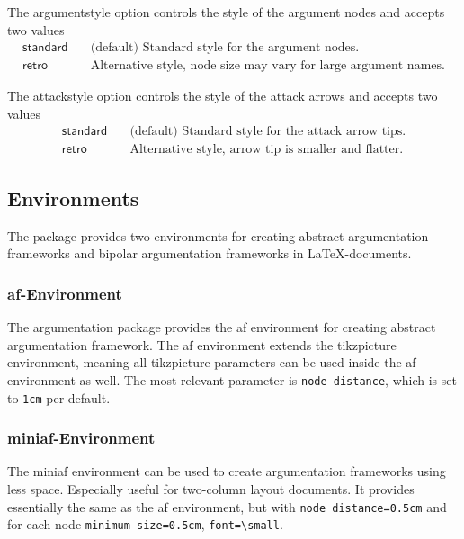 \documentclass{article}
\begin{document}
    The \textsf{argumentstyle} option controls the style of the argument nodes and accepts two values
        \begin{align*}
            \mathsf{standard} &\quad \text{(default) Standard style for the argument nodes.}\\
            \mathsf{retro} &\quad \text{Alternative style, node size may vary for large argument names.}
        \end{align*}

    The \textsf{attackstyle} option controls the style of the attack arrows and accepts two values
    \begin{align*}
        \mathsf{standard} &\quad \text{(default) Standard style for the attack arrow tips.}\\
        \mathsf{retro} &\quad \text{Alternative style, arrow tip is smaller and flatter.}
    \end{align*}
    

\subsection{Environments}
The package provides two environments for creating abstract argumentation frameworks and bipolar argumentation frameworks in \LaTeX-documents.

\subsubsection{\textsf{af}-Environment}
    The \textsf{argumentation} package provides the \textsf{af} environment for creating abstract argumentation framework.
    The \textsf{af} environment extends the \textsf{tikzpicture} environment, meaning all \textsf{tikzpicture}-parameters can be used inside the \textsf{af} environment as well.
    The most relevant parameter is \verb|node distance|, which is set to \verb|1cm| per default.
    
\subsubsection{\textsf{miniaf}-Environment}
    The \textsf{miniaf} environment can be used to create argumentation frameworks using less space.
    Especially useful for two-column layout documents.
    It provides essentially the same as the \textsf{af} environment, but with \verb|node distance=0.5cm| and for each node \verb|minimum size=0.5cm|, \verb|font=\small|.
\end{document}
